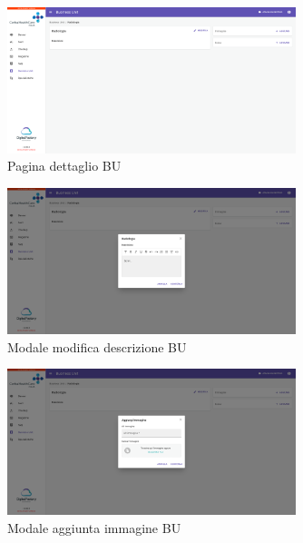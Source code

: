 \begin{figure}[H]
    \centering
    \includegraphics[width=0.75\textwidth]{images/capitolo5/f8_businessUnits/PageBusinessUnit.png} 
    \caption{Pagina dettaglio BU} 
    \label{fig:PageBusinessUnit}
\end{figure}

\begin{figure}[H]
    \centering
    \includegraphics[width=0.75\textwidth]{images/capitolo5/f8_businessUnits/ModalBusinessUnit_edit.png} 
    \caption{Modale modifica descrizione BU} 
    \label{fig:ModalBusinessUnit_edit}
\end{figure}

\begin{figure}[H]
    \centering
    \includegraphics[width=0.75\textwidth]{images/capitolo5/f8_businessUnits/ModalBusinessUnit_createImage.png} 
    \caption{Modale aggiunta immagine BU} 
    \label{fig:ModalBusinessUnit_createImage}
\end{figure}

